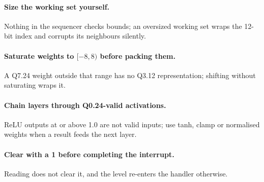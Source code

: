 \paragraph{Size the working set yourself.} Nothing in the sequencer checks bounds; an oversized working set wraps the 12-bit index and corrupts its neighbours silently.

\paragraph{Saturate weights to $[-8, 8)$ before packing them.} A Q7.24 weight outside that range has no Q3.12 representation; shifting without saturating wraps it.

\paragraph{Chain layers through Q0.24-valid activations.} ReLU outputs at or above 1.0 are not valid inputs; use tanh, clamp or normalised weights when a result feeds the next layer.

\paragraph{Clear  with a 1 before completing the interrupt.} Reading  does not clear it, and the level re-enters the handler otherwise.
